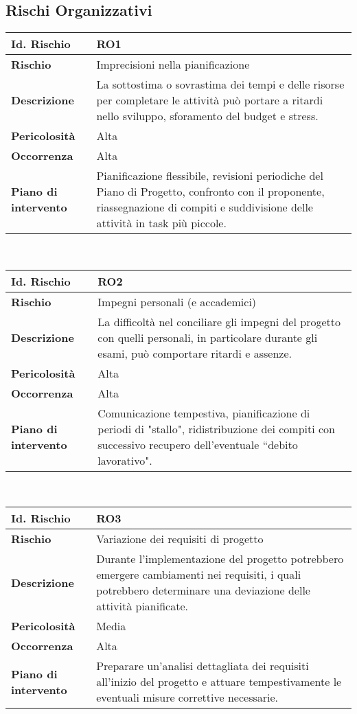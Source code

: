 \subsection{Rischi Organizzativi}

\begin{tabular}{|L{4cm}|L{9.7cm}|}
    \hline
    \textbf{Id. Rischio} & \textbf{RO1} \\
    \hline
    \textbf{Rischio} & Imprecisioni nella pianificazione \\
    \hline
    \textbf{Descrizione} & La sottostima o sovrastima dei tempi e delle risorse per completare le attività può portare a ritardi nello sviluppo, sforamento del budget e stress. \\
    \hline
    \textbf{Pericolosità} & Alta \\
    \hline
    \textbf{Occorrenza} & Alta \\
    \hline
    \textbf{Piano di intervento} & Pianificazione flessibile, revisioni periodiche del Piano di Progetto, confronto con il proponente, riassegnazione di compiti e suddivisione delle attività in task più piccole. \\
    \hline
\end{tabular}
\\[30pt]
\begin{tabular}{|L{4cm}|L{9.7cm}|}
    \hline
    \textbf{Id. Rischio} & \textbf{RO2} \\
    \hline
    \textbf{Rischio} & Impegni personali (e accademici) \\
    \hline
    \textbf{Descrizione} & La difficoltà nel conciliare gli impegni del progetto con quelli personali, in particolare durante gli esami, può comportare ritardi e assenze. \\
    \hline
    \textbf{Pericolosità} & Alta \\
    \hline
    \textbf{Occorrenza} & Alta \\
    \hline
    \textbf{Piano di intervento} & Comunicazione tempestiva, pianificazione di periodi di "stallo", ridistribuzione dei compiti con successivo recupero dell'eventuale ``debito lavorativo". \\
    \hline
\end{tabular}
\\[30pt]
\begin{tabular}{|L{4cm}|L{9.7cm}|}
    \hline
    \textbf{Id. Rischio} & \textbf{RO3} \\
    \hline
    \textbf{Rischio} & Variazione dei requisiti di progetto \\
    \hline
    \textbf{Descrizione} & Durante l'implementazione del progetto potrebbero emergere cambiamenti nei requisiti, i quali potrebbero determinare una deviazione delle attività pianificate. \\
    \hline
    \textbf{Pericolosità} & Media \\
    \hline
    \textbf{Occorrenza} & Alta \\
    \hline
    \textbf{Piano di intervento} & Preparare un'analisi dettagliata dei requisiti all'inizio del progetto e attuare tempestivamente le eventuali misure correttive necessarie. \\
    \hline
\end{tabular}
